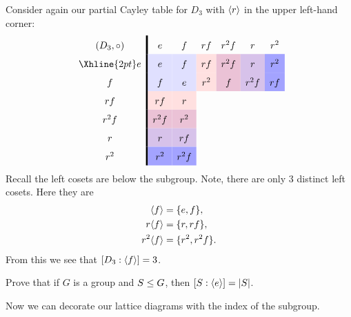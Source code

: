 \documentclass{ximera}
\begin{document}
\begin{example}
  Consider again our partial Cayley table for $D_3$ with $\langle r\rangle$ in
  the upper left-hand corner:
      \[
    \renewcommand{\arraystretch}{1.6}
    \begin{array}{c!{\vline width 2pt}cccccc}
      (D_3,\circ)& e                         & f                              & rf                            & r^2f                             & r                                    & r^2  \\  \Xhline{2pt}
      e          & e\cellcolor{blue!12!white}     & f\cellcolor{blue!12!white}    & rf\cellcolor{red!12!white}   & r^2f \cellcolor{blue!33!red!24!white}     & r  \cellcolor{blue!66!red!24!white}   & r^2 \cellcolor{blue!36!white} \\  
      f                & f\cellcolor{blue!12!white}    & e\cellcolor{blue!12!white}   & r^2 \cellcolor{red!12!white}    & f\cellcolor{blue!33!red!24!white} & r^2f \cellcolor{blue!66!red!24!white}    & rf \cellcolor{blue!36!white}   \\  
      rf                & rf\cellcolor{red!12!white}   & r\cellcolor{red!12!white}     &    &    &  &     \\  
      r^2f       & r^2f \cellcolor{blue!33!red!24!white}   & r^2 \cellcolor{blue!33!red!24!white}   &   &      &   &   \\  
      r      & r \cellcolor{blue!66!red!24!white}   & rf \cellcolor{blue!66!red!24!white} &    &   &      &     \\  
      r^2       & r^2 \cellcolor{blue!36!white} & r^2f \cellcolor{blue!36!white}    &   &    &     &      \\  
    \end{array}
    \]
    Recall the left cosets are below the subgroup. Note, there are
    only $3$ distinct left cosets.  Here they are
    \begin{align*}
      \langle f\rangle &= \{e, f\},\\
      r\langle f\rangle &= \{r, rf\},\\
      r^2\langle f\rangle &= \{r^2, r^2f\}.
    \end{align*}
    From this we see that $[D_3: \langle f\rangle] = 3$.
\end{example}


\begin{exercise}
  Prove that if $G$ is a group and $S\leq G$, then $[S:\langle e\rangle] = |S|$.
\end{exercise}


Now we can decorate our lattice diagrams with the index of the
subgroup.
\end{document}
